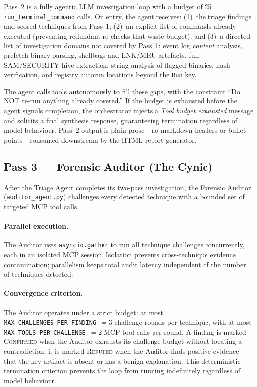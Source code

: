 \documentclass[sigconf, nonacm]{acmart}
\begin{document}
Pass~2 is a fully agentic LLM investigation loop with a budget of
25 \texttt{run\_terminal\_command} calls.  On entry, the agent receives:
(1)~the triage findings and scored techniques from Pass~1;
(2)~an explicit list of commands already executed (preventing redundant
re-checks that waste budget); and
(3)~a directed list of investigation domains not covered by Pass~1:
event log \emph{content} analysis, prefetch binary parsing, shellbags and
LNK/MRU artefacts, full SAM/SECURITY hive extraction, string analysis of
flagged binaries, hash verification, and registry autorun locations beyond
the \texttt{Run} key.

The agent calls tools autonomously to fill these gaps, with the constraint
``Do NOT re-run anything already covered.''  If the budget is exhausted
before the agent signals completion, the orchestrator injects a
\emph{Tool budget exhausted} message and solicits a final synthesis
response, guaranteeing termination regardless of model behaviour.
Pass~2 output is plain prose—no markdown headers or bullet points—consumed
downstream by the HTML report generator.

\subsection{Pass 3 — Forensic Auditor (The Cynic)}
\label{sec:auditor}

After the Triage Agent completes its two-pass investigation, the
Forensic Auditor (\texttt{auditor\_agent.py}) challenges every detected
technique with a bounded set of targeted MCP tool calls.

\paragraph{Parallel execution.}
The Auditor uses \texttt{asyncio.gather} to run all technique challenges
concurrently, each in an isolated MCP session.  Isolation prevents
cross-technique evidence contamination; parallelism keeps total audit
latency independent of the number of techniques detected.

\paragraph{Convergence criterion.}
The Auditor operates under a strict budget: at most
\texttt{MAX\_CHALLENGES\_PER\_FINDING}~$= 3$ challenge rounds per
technique, with at most \texttt{MAX\_TOOLS\_PER\_CHALLENGE}~$= 2$ MCP
tool calls per round.  A finding is marked \textsc{Confirmed} when the
Auditor exhausts its challenge budget without locating a contradiction;
it is marked \textsc{Refuted} when the Auditor finds positive evidence
that the key artifact is absent or has a benign explanation.  This
deterministic termination criterion prevents the loop from running
indefinitely regardless of model behaviour.
\end{document}
